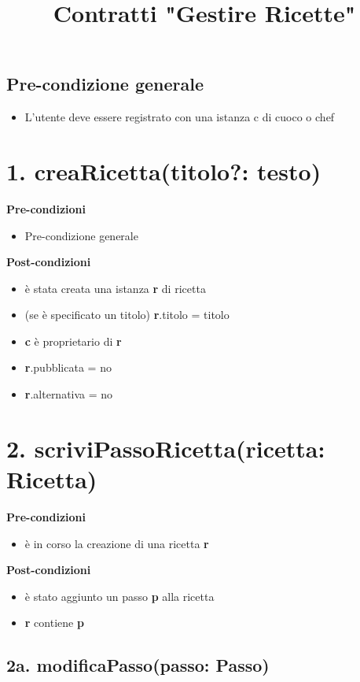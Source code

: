 \documentclass[14pt]{extarticle}
\begin{document}
\title{Contratti "Gestire Ricette"}
\date{}
\maketitle

\subsection*{Pre-condizione generale}
\begin{itemize}
  \item L'utente deve essere registrato con una istanza c di cuoco o chef
\end{itemize}

\section*{1. creaRicetta(titolo?: testo)}
\textbf{Pre-condizioni}
\begin{itemize}
  \item Pre-condizione generale
\end{itemize}
\textbf{Post-condizioni}
\begin{itemize}
  \item è stata creata una istanza \textbf{r} di ricetta
  \item (se è specificato un titolo) \textbf{r}.titolo = titolo
  \item \textbf{c} è proprietario di \textbf{r}
  \item \textbf{r}.pubblicata = no
  \item \textbf{r}.alternativa = no
\end{itemize}

\section*{2. scriviPassoRicetta(ricetta: Ricetta)}

\textbf{Pre-condizioni} 	
\begin{itemize}
  \item è in corso la creazione di una ricetta  \textbf{r}
\end{itemize}
\textbf{Post-condizioni}
\begin{itemize}
  \item è stato aggiunto un passo  \textbf{p} alla ricetta
  \item  \textbf{r} contiene  \textbf{p}
\end{itemize}

\subsection*{2a. modificaPasso(passo: Passo)}
\end{document}
